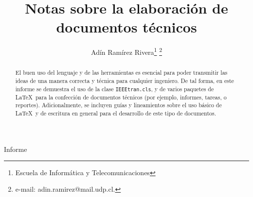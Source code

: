 \documentclass[twocolumn,11pts]{IEEEtran}
\begin{document}
\let\orilabel\label

%
\title{Notas sobre la elaboración de documentos técnicos}
%

\author{Adín Ramírez Rivera\thanks{Escuela de Informática y Telecomunicaciones}%
\thanks{e-mail: adin.ramirez@mail.udp.cl.}%
}
% 
%


%
{Informe}%

\maketitle


\begin{abstract}
El buen uso del lenguaje y de las herramientas es esencial para poder transmitir las ideas de una manera correcta y técnica para cualquier ingeniero. De tal forma, en este informe se demuestra el uso de la clase \texttt{IEEEtran.cls}, y de varios paquetes de \LaTeX\ para la confección de documentos técnicos (por ejemplo, informes, tareas, o reportes). Adicionalmente, se incluyen guías y lineamientos sobre el uso básico de \LaTeX\ y de escritura en general para el desarrollo de este tipo de documentos.
\end{abstract}
\end{document}
